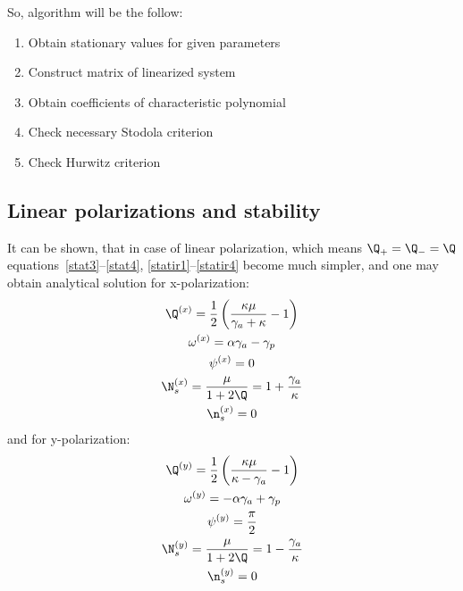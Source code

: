\documentclass[12pt, notitlepage]{report}
\begin{document}

So, algorithm will be the follow:
\begin{enumerate}
	\item Obtain stationary values for given parameters
	\item Construct matrix of linearized system
	\item Obtain coefficients of characteristic polynomial
	\item Check necessary Stodola criterion
	\item Check Hurwitz criterion
\end{enumerate}

\subsection{Linear polarizations and stability}
It can be shown, that in case of linear polarization, which means $\Q_+=\Q_-=\Q$ equations~\eqref{stat3}--\eqref{stat4}, \eqref{statir1}--\eqref{statir4} become much simpler, and one may obtain analytical solution for x-polarization:
\begin{gather}
	\Q^{(x)} = \frac{1}{2} \left(\frac{\kappa  \mu }{\gamma_a + \kappa } - 1\right)\\
	\omega^{(x)} = \alpha \gamma_a - \gamma_p\\
	\psi^{(x)} = 0\\
	\N_s^{(x)} = \frac{\mu}{1+2\Q} = 1 + \frac{\gamma_a}{\kappa}\\
	\n_s^{(x)} = 0
\end{gather}
and for y-polarization:
\begin{gather}
	\Q^{(y)} = \frac{1}{2} \left(\frac{\kappa  \mu }{\kappa - \gamma_a } - 1\right)\\
	\omega^{(y)} = -\alpha \gamma_a + \gamma_p\\
	\psi^{(y)} = \frac{\pi}{2}\\
	\N_s^{(y)} = \frac{\mu}{1+2\Q} = 1 - \frac{\gamma_a}{\kappa}\\
	\n_s^{(y)} = 0
\end{gather}
\end{document}
